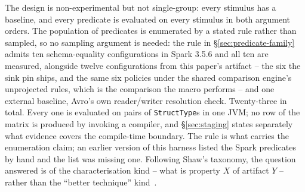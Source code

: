 The design is non-experimental but not single-group: every stimulus has a baseline, and every predicate is evaluated on every stimulus in both argument orders. The population of predicates is enumerated by a stated rule rather than sampled, so no sampling argument is needed: the rule in \S\ref{sec:predicate-family} admits ten schema-equality configurations in Spark 3.5.6 and all ten are measured, alongside twelve configurations from this paper's artifact -- the six the sink pin ships, and the same six policies under the shared comparison engine's unprojected rules, which is the comparison the macro performs -- and one external baseline, Avro's own reader/writer resolution check. Twenty-three in total. Every one is evaluated on pairs of \texttt{StructType}s in one JVM; no row of the matrix is produced by invoking a compiler, and \S\ref{sec:staging} states separately what evidence covers the compile-time boundary. The rule is what carries the enumeration claim; an earlier version of this harness listed the Spark predicates by hand and the list was missing one. Following Shaw's taxonomy, the question answered is of the characterisation kind -- what is property $X$ of artifact $Y$ -- rather than the ``better technique'' kind~\cite{shaw_2003}.

